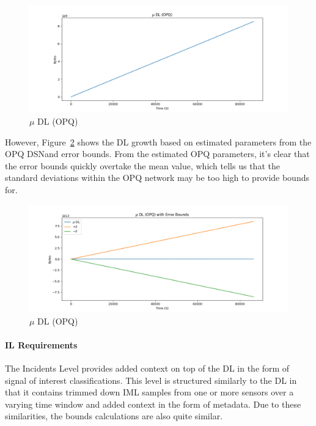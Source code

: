 \begin{figure}[H]
	\centering
	\includegraphics[width=\linewidth]{figures/plot_dl_opq_no_err.png}
	\caption{$\mu$ DL (OPQ)}
	\label{fig:plot_dl_opq_no_err}
\end{figure}

However, Figure~\ref{fig:plot_dl_opq_err} shows the DL growth based on estimated parameters from the OPQ DSN\@ and error bounds. From the estimated OPQ parameters, it's clear that the error bounds quickly overtake the mean value, which tells us that the standard deviations within the OPQ network may be too high to provide bounds for.

\begin{figure}[H]
	\centering
	\includegraphics[width=\linewidth]{figures/plot_dl_opq_err.png}
	\caption{$\mu$ DL (OPQ)}
	\label{fig:plot_dl_opq_err}
\end{figure}

\paragraph{IL Requirements}
The Incidents Level provides added context on top of the DL in the form of signal of interest classifications. This level is structured similarly to the DL in that it contains trimmed down IML samples from one or more sensors over a varying time window and added context in the form of metadata. Due to these similarities, the bounds calculations are also quite similar.


